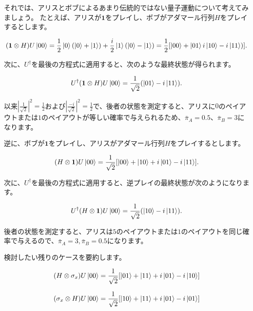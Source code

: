 それでは、アリスとボブによるあまり伝統的ではない量子運動について考えてみましょう。 たとえば、アリスが$\mathbf{1}$をプレイし、ボブがアダマール行列$H$をプレイするとします。

\begin{equation}
\label{146}
( \mathbf{1} \otimes H ) U \ket{00}
=
\frac{1}{2}
\ket{0}( \ket{0} +  \ket{1}) 
+ \frac{i}{2} \ket{1} (\ket{0} - \ket{1})
=
\frac{1}{2}
[\ket{00} +  \ket{01} 
i \ket{10} - i \ket{11})].
\end{equation}

次に、$U^{\dagger}$を最後の方程式に適用すると、次のような最終状態が得られます。

\begin{equation}
\label{147}
U^{\dagger}( \mathbf{1} \otimes H ) U \ket{00}
=
\frac{1}{\sqrt{2}}  (\ket{01} - i \ket{11}).
\end{equation}


以来$| \frac{1}{\sqrt{2}}|^2 = \frac{1}{2} $および$| \frac{-i}{\sqrt{2}}|^2 = \frac{1}{2} $で、後者の状態を測定すると、アリスに$0$のペイアウトまたは$1$のペイアウトが等しい確率で与えられるため、$\bar{\pi}_A = 0.5$、$\bar{\pi}_B = 3$になります。

逆に、ボブが$\mathbf{1}$をプレイし、アリスがアダマール行列$H$をプレイするとします。

\begin{equation}
\label{148}
(H \otimes  \mathbf{1}) U \ket{00}
=
\frac{1}{\sqrt{2}}  [\ket{00} + \ket{10} + i \ket{01} - i \ket{11} ].
\end{equation}

次に、$ U^{\dagger} $を最後の方程式に適用すると、逆プレイの最終状態が次のようになります。

\begin{equation}
\label{149}
U^{\dagger} ( H \otimes  \mathbf{1}  ) U \ket{00}
=
\frac{1}{\sqrt{2}}  ( \ket{10} - i \ket{11} ).
\end{equation}

後者の状態を測定すると、アリスは$5$のペイアウトまたは$1$のペイアウトを同じ確率で与えるので、$\bar{\pi}_A =3, \bar{\pi}_B =0.5  $になります。

検討したい残りのケースを要約します。

\begin{equation}
\label{150}
(H \otimes  \sigma_x) U \ket{00}
=
\frac{1}{\sqrt{2}}  [\ket{01} + \ket{11} + i \ket{01} - i \ket{10} ]
\end{equation}

\begin{equation}
\label{151}
(\sigma_x \otimes H ) U \ket{00}
=
\frac{1}{\sqrt{2}}  [\ket{10} + \ket{11} + i \ket{01} - i \ket{01} ]
\end{equation}

